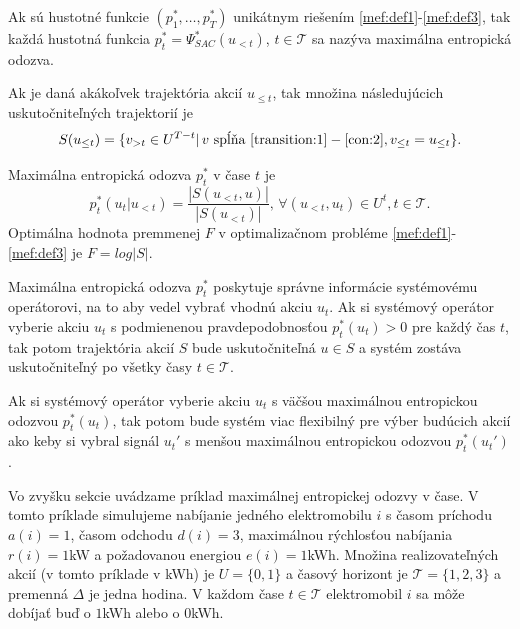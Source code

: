 
\begin{definition}
Ak sú hustotné funkcie $(p_{1}^{*},\dots, p_{T}^{*})$ unikátnym riešením \eqref{mef:def1}-\eqref{mef:def3}, tak každá hustotná funkcia $p_{t}^{*} = \Psi^{*}_{SAC}(u_{<t})$, $t \in \mathcal{T}$ sa nazýva maximálna entropická odozva.
\end{definition}






Ak je daná akákoľvek trajektória akcií $u_{\leq t}$, tak množina následujúcich uskutočniteľných trajektorií je 
\begin{equation}
    S(u_{\leq t}) = \{v_{>t} \in U^{T-t} | \, \text{$v$ spĺňa } \eqref{transition:1}-\eqref{con:2}, v_{\leq t} = u_{\leq t}   \}.
\end{equation}



\begin{theorem}
Maximálna entropická odozva $p_{t}^{*}$ v čase $t$ je 
\begin{equation}
    p_{t}^{*}(u_{t} | u_{<t}) = \frac{|S(u_{<t}, u)|}{|S(u_{<t})|}, \, \forall (u_{<t}, u_{t}) \in U^{t}, t \in \mathcal{T}.
\end{equation}
Optimálna hodnota premmenej $F$ v optimalizačnom probléme \eqref{mef:def1}-\eqref{mef:def3} je $F = log |S|$.  
\end{theorem}

Maximálna entropická odozva $p_{t}^{*}$ poskytuje správne informácie systémovému operátorovi, na to aby vedel vybrať vhodnú akciu $u_{t}$. Ak si systémový operátor vyberie akciu $u_{t}$ s podmienenou pravdepodobnosťou $p_{t}^{*}(u_{t}) > 0$ pre každý čas $t$, tak potom trajektória akcií $S$ bude uskutočniteľná $u \in S$ a systém zostáva uskutočniteľný po všetky časy $t \in \mathcal{T}$.


Ak si systémový operátor vyberie akciu $u_{t}$ s väčšou maximálnou entropickou odozvou $p_{t}^{*}(u_{t})$, tak potom bude systém viac flexibilný pre výber budúcich akcií ako keby si vybral signál $u_{t}'$ s menšou maximálnou entropickou odozvou $p_{t}^{*}(u_{t}')$.

Vo zvyšku sekcie uvádzame príklad maximálnej entropickej odozvy v čase. V tomto príklade simulujeme nabíjanie jedného elektromobilu $i$ s časom príchodu $a(i) = 1$, časom odchodu $d(i) = 3$, maximálnou rýchlosťou nabíjania $r(i) = 1$kW a požadovanou energiou $e(i) = 1$kWh. Množina realizovateľných akcií (v tomto príklade v kWh) je $U = \{0, 1\}$ a časový horizont je $\mathcal{T} = \{1, 2, 3\}$ a premenná $\Delta$ je jedna hodina. V každom čase $t \in \mathcal{T}$ elektromobil $i$ sa môže dobíjať buď o $1$kWh alebo o $0$kWh.

